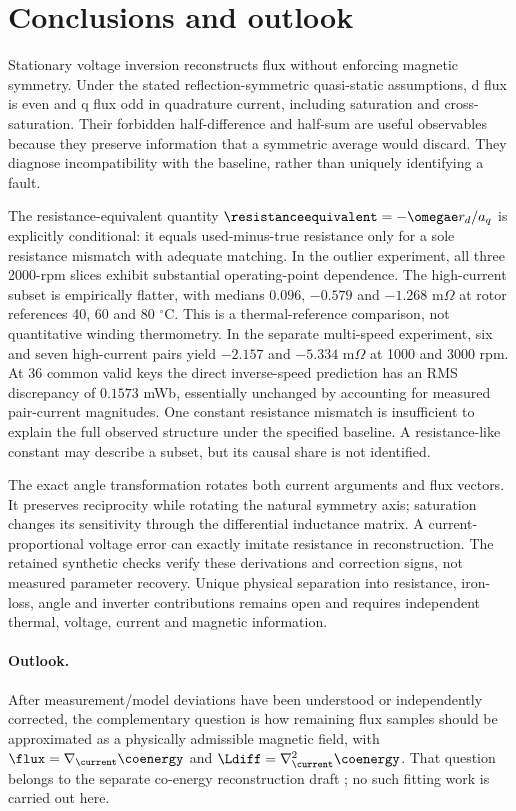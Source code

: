 \section{Conclusions and outlook}
Stationary voltage inversion reconstructs flux without enforcing magnetic
symmetry. Under the stated reflection-symmetric quasi-static assumptions,
d flux is even and q flux odd in quadrature current, including saturation and
cross-saturation. Their forbidden half-difference and half-sum are useful
observables because they preserve information that a symmetric average
would discard. They diagnose incompatibility with the baseline, rather than
uniquely identifying a fault.

The resistance-equivalent quantity $\resistanceequivalent=-\omegae r_d/a_q$
is explicitly conditional: it equals used-minus-true resistance only for a
sole resistance mismatch with adequate matching. In the outlier experiment,
all three 2000-rpm slices exhibit substantial operating-point dependence.
The high-current subset is empirically flatter, with medians $0.096$,
$-0.579$ and $-1.268$ m$\Omega$ at rotor references 40, 60 and 80 $^\circ$C.
This is a thermal-reference comparison, not quantitative winding thermometry.
In the separate multi-speed experiment, six and seven high-current pairs
yield $-2.157$ and $-5.334$ m$\Omega$ at 1000 and 3000 rpm. At 36 common
valid keys the direct inverse-speed prediction has an RMS discrepancy of
$0.1573$ mWb, essentially unchanged by accounting for measured pair-current
magnitudes. One constant resistance mismatch is insufficient to explain the
full observed structure under the specified baseline. A resistance-like
constant may describe a subset, but its causal share is not identified.

The exact angle transformation rotates both current arguments and flux
vectors. It preserves reciprocity while rotating the natural symmetry axis;
saturation changes its sensitivity through the differential inductance
matrix. A current-proportional voltage error can exactly imitate resistance
in reconstruction. The retained synthetic checks verify these derivations
and correction signs, not measured parameter recovery. Unique physical
separation into resistance, iron-loss, angle and inverter contributions
remains open and requires independent thermal, voltage, current and magnetic
information.

\paragraph{Outlook.}
After measurement/model deviations have been understood or independently
corrected, the complementary question is how remaining flux samples should
be approximated as a physically admissible magnetic field, with
$\flux=\nabla_{\current}\coenergy$ and
$\Ldiff=\nabla^2_{\current}\coenergy$. That question belongs to the separate
co-energy reconstruction draft \cite{companion-coenergy}; no such fitting
work is carried out here.
